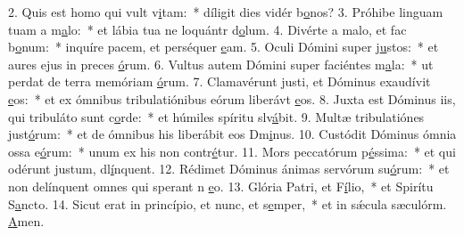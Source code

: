 2. Quis est homo qui vult v\uline{i}tam:~* díligit dies vidér b\uline{o}nos?
3. Próhibe linguam tuam a m\uline{a}lo:~* et lábia tua ne loquántr d\uline{o}lum.
4. Divérte a malo, et fac b\uline{o}num:~* inquíre pacem, et perséquer \uline{e}am.
5. Oculi Dómini super j\uline{u}stos:~* et aures ejus in preces \uline{ó}rum.
6. Vultus autem Dómini super faciéntes m\uline{a}la:~* ut perdat de terra memóriam \uline{ó}rum.
7. Clamavérunt justi, et Dóminus exaudívit \uline{e}os:~* et ex ómnibus tribulatiónibus eórum liberávt \uline{e}os.
8. Juxta est Dóminus iis, qui tribuláto sunt c\uline{o}rde:~* et húmiles spíritu slv\uline{á}bit.
9. Multæ tribulatiónes just\uline{ó}rum:~* et de ómnibus his liberábit eos Dm\uline{i}nus.
10. Custódit Dóminus ómnia ossa e\uline{ó}rum:~* unum ex his non contr\uline{é}tur.
11. Mors peccatórum p\uline{é}ssima:~* et qui odérunt justum, dl\uline{í}nquent.
12. Rédimet Dóminus ánimas servórum su\uline{ó}rum:~* et non delínquent omnes qui sperant n \uline{e}o.
13. Glória Patri, et F\uline{í}lio,~* et Spirítu S\uline{a}ncto.
14. Sicut erat in princípio, et nunc, et s\uline{e}mper,~* et in sǽcula sæculórm. \uline{A}men.
